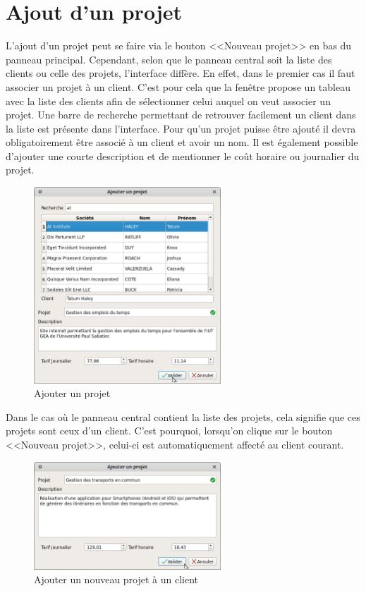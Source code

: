 \section{Ajout d'un projet}
L'ajout d’un projet peut se faire via le bouton <<Nouveau projet>> en bas du panneau principal.
Cependant, selon que le panneau central soit la liste des clients ou celle des projets, l'interface diffère. En effet, dans le premier cas il faut associer un projet à un client. 
C'est pour cela que la fenêtre propose un tableau avec la liste des clients afin de sélectionner celui auquel on veut associer un projet. 
Une barre de recherche permettant de retrouver facilement un client dans la liste est présente dans l'interface. Pour qu'un projet puisse être ajouté il devra obligatoirement être associé à un client et avoir un nom. 
Il est également possible d'ajouter une courte description et de mentionner le coût horaire ou journalier du projet. 
\begin{figure}[H]
	\centering
	\includegraphics[width=7cm]{screens/ajouterProjet.png}
	\caption{Ajouter un projet}
\end{figure}
Dans le cas où le panneau central contient la liste des projets, cela signifie que ces projets sont ceux d'un client. C'est pourquoi, lorsqu'on clique sur le bouton <<Nouveau projet>>, celui-ci est automatiquement affecté au client courant. 
\begin{figure}[H]
	\centering
	\includegraphics[width=7cm]{screens/ajouterProjetClient.png}
	\caption{Ajouter un nouveau projet à un client}
\end{figure}

